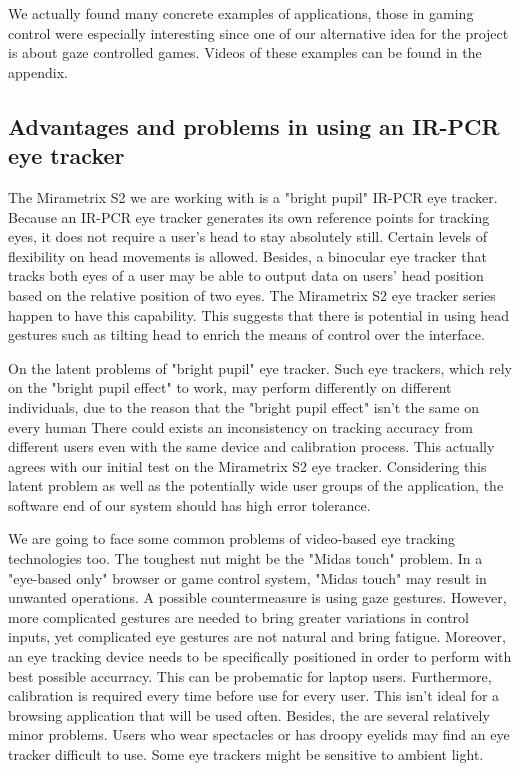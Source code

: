 \documentclass[english]{tktltiki}
\begin{document}
We actually found many concrete examples of applications, those in gaming control were especially interesting since one of our alternative idea for the project is about gaze controlled games. Videos of these examples can be found in the appendix. 

\subsection{Advantages and problems in using an IR-PCR eye tracker}

The Mirametrix S2 we are working with is a "bright pupil" IR-PCR eye tracker. Because an IR-PCR eye tracker generates its own reference points for tracking eyes, it does not require a user's head to stay absolutely still. Certain levels of flexibility on head movements is allowed. Besides, a binocular eye tracker that tracks both eyes of a user may be able to output data on users' head position based on the relative position of two eyes. The Mirametrix S2 eye tracker series happen to have this capability. This suggests that there is potential in using head gestures such as tilting head to enrich the means of control over the interface. 

On the latent problems of "bright pupil" eye tracker. Such eye trackers, which rely on the "bright pupil effect" to work, may perform differently on different individuals, due to the reason that the "bright pupil effect" isn't the same on every human \cite{Nguyen:2002:DIB:507072.507099} There could exists an inconsistency on tracking accuracy from different users even with the same device and calibration process. This actually agrees with our initial test on the Mirametrix S2 eye tracker. Considering this latent problem as well as the potentially wide user groups of the application, the software end of our system should has high error tolerance.

We are going to face some common problems of video-based eye tracking technologies too. The toughest nut might be the "Midas touch" problem.\cite{Velichkovsky97} In a "eye-based only" browser or game control system, "Midas touch" may result in unwanted operations. A possible countermeasure is using gaze gestures. \cite{Ohno:1998:FEG:786112.786297} However, more complicated gestures are needed to bring greater variations in control inputs, yet complicated eye gestures are not natural and bring fatigue. Moreover, an eye tracking device needs to be specifically positioned in order to perform with best possible accurracy. This can be probematic for laptop users.  Furthermore, calibration is required every time before use for every user. This isn't ideal for a browsing application that will be used often. Besides, the are several relatively minor problems. Users who wear spectacles or has droopy eyelids may find an eye tracker difficult to use. Some eye trackers might be sensitive to ambient light. 
\end{document}
